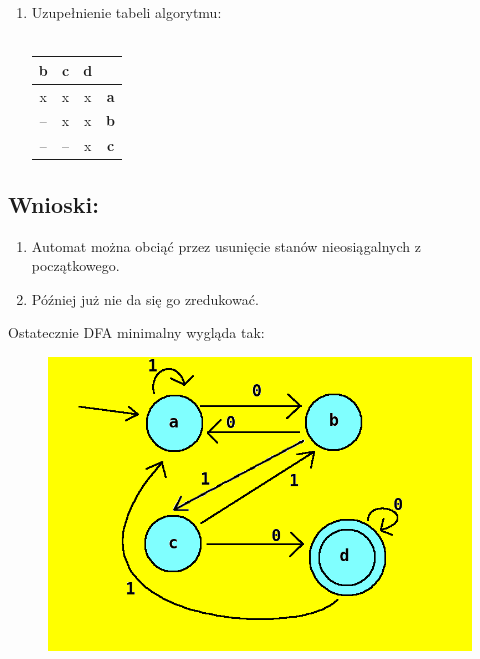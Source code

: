 \documentclass[12pt]{article}
\begin{document}
\begin{enumerate}
    \item  Uzupełnienie tabeli algorytmu:\\\\
    \begin{table}[h]
        \label{dupa1}
        \centering
        \begin{tabular}{c|c|c|c}
            \textbf{b}  & \textbf{c} & \textbf{d} & \\
            \hline
            x & x & x & \textbf{a}\\
            \hline
            -- & x & x & \textbf{b}\\
            \hline
            -- & -- & x & \textbf{c}\\
        \end{tabular} 
    \end{table}

\end{enumerate}
\newpage
\subsection*{Wnioski:}
    \begin{enumerate}
        \item Automat można obciąć przez usunięcie stanów nieosiągalnych z początkowego.
        \item Później już nie da się go zredukować.
    \end{enumerate}
Ostatecznie DFA minimalny wygląda tak:
\begin{figure}[htp]
    \centering
    \includegraphics[width=12cm]{automat_kolor.png}
\end{figure}
\end{document}
